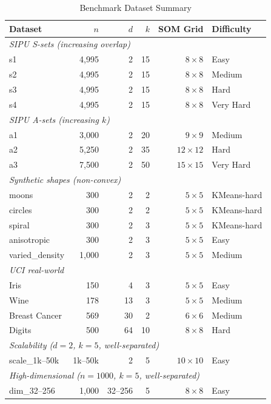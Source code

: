 \documentclass[journal]{IEEEtran}
\begin{document}
\begin{table}[!t]
\caption{Benchmark Dataset Summary}
\label{tab:datasets}
\centering
\renewcommand{\arraystretch}{1.05}
\small
\begin{tabular}{lrrrrl}
\toprule
Dataset & $n$ & $d$ & $k$ & SOM Grid & Difficulty \\
\midrule
\multicolumn{6}{l}{\textit{SIPU S-sets (increasing overlap)}} \\
s1 & 4,995 & 2 & 15 & $8{\times}8$ & Easy \\
s2 & 4,995 & 2 & 15 & $8{\times}8$ & Medium \\
s3 & 4,995 & 2 & 15 & $8{\times}8$ & Hard \\
s4 & 4,995 & 2 & 15 & $8{\times}8$ & Very Hard \\
\multicolumn{6}{l}{\textit{SIPU A-sets (increasing $k$)}} \\
a1 & 3,000 & 2 & 20 & $9{\times}9$ & Medium \\
a2 & 5,250 & 2 & 35 & $12{\times}12$ & Hard \\
a3 & 7,500 & 2 & 50 & $15{\times}15$ & Very Hard \\
\multicolumn{6}{l}{\textit{Synthetic shapes (non-convex)}} \\
moons & 300 & 2 & 2 & $5{\times}5$ & KMeans-hard \\
circles & 300 & 2 & 2 & $5{\times}5$ & KMeans-hard \\
spiral & 300 & 2 & 3 & $5{\times}5$ & KMeans-hard \\
anisotropic & 300 & 2 & 3 & $5{\times}5$ & Easy \\
varied\_density & 1,000 & 2 & 3 & $5{\times}5$ & Medium \\
\multicolumn{6}{l}{\textit{UCI real-world}} \\
Iris & 150 & 4 & 3 & $5{\times}5$ & Easy \\
Wine & 178 & 13 & 3 & $5{\times}5$ & Medium \\
Breast Cancer & 569 & 30 & 2 & $6{\times}6$ & Medium \\
Digits & 500 & 64 & 10 & $8{\times}8$ & Hard \\
\multicolumn{6}{l}{\textit{Scalability ($d=2$, $k=5$, well-separated)}} \\
scale\_1k--50k & 1k--50k & 2 & 5 & $10{\times}10$ & Easy \\
\multicolumn{6}{l}{\textit{High-dimensional ($n=1000$, $k=5$, well-separated)}} \\
dim\_32--256 & 1,000 & 32--256 & 5 & $8{\times}8$ & Easy \\
\bottomrule
\end{tabular}
\end{table}
\end{document}
